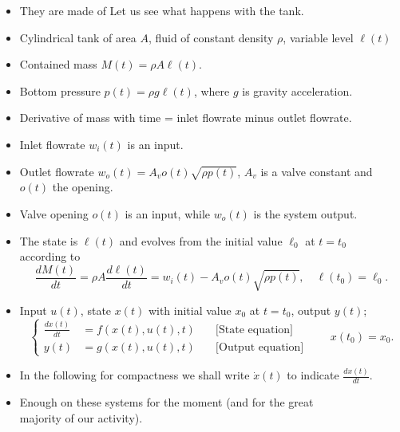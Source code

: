 \begin{frame}
\myPause
 \begin{itemize}[<+-| alert@+>]
 \item They are made of  Let us see what happens with the tank.
 \item Cylindrical tank of area $A$, fluid of constant density $\rho$, variable level $\ell(t)$
 \item Contained mass $M(t) = \rho A \ell(t)$.
 \item Bottom pressure $p(t) = \rho g \ell(t)$, where $g$ is gravity acceleration.
 \item Derivative of mass with time = inlet flowrate minus outlet flowrate.
 \item Inlet flowrate $w_i(t)$ is an input.
 \item Outlet flowrate $w_o(t)=A_v o(t) \sqrt{\rho p(t)}$, $A_v$ is a valve constant and $o(t)$ the opening.
 \item Valve opening $o(t)$ is an input, while $w_o(t)$ is the system output.
 \item The state is $\ell(t)$ and evolves from the initial value $\ell_0$ at $t=t_0$\\
       according to
       \begin{displaymath}
        \frac{dM(t)}{dt} = \rho A \frac{d\ell(t)}{dt} = w_i(t) - A_v o(t) \sqrt{\rho p(t)}, \quad
        \ell(t_0) = \ell_0.
       \end{displaymath}
 \end{itemize}
\end{frame}

\begin{frame}
\myPause
 \begin{itemize}[<+-| alert@+>]
 \item Input $u(t)$, state $x(t)$ with initial value $x_0$ at $t=t_0$, output $y(t)$;
       \begin{displaymath}
        \left\{\begin{array}{rll}
         \frac{dx(t)}{dt} &= f\left(x(t),u(t),t\right) &\quad \text{[State equation]} \\
         y(t)             &= g\left(x(t),u(t),t\right) &\quad \text{[Output equation]}
        \end{array}\right. \qquad
        x(t_0) = x_0.
       \end{displaymath}
 \item In the following for compactness we shall write $\dot{x}(t)$ to indicate $\frac{dx(t)}{dt}$.
 \item \vfill Enough on these systems for the moment (and for the great\\
       majority of our activity).
 \end{itemize}
\end{frame}

